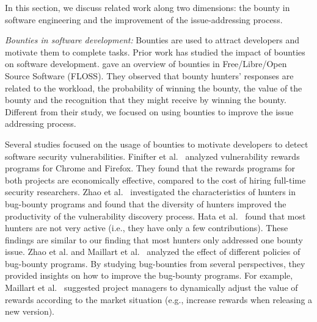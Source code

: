 In this section, we discuss related work along two dimensions: the bounty in software engineering and the improvement of the issue-addressing process.

\textit{Bounties in software development:}
Bounties are used to attract developers and motivate them to complete tasks. Prior work has studied the impact of bounties on software development. \cite{krishnamurthy2006bounty} gave an overview of bounties in Free/Libre/Open Source Software (FLOSS).
They observed that bounty hunters' responses are related to the workload, the probability of winning the bounty, the value of the bounty and the recognition that they might receive by winning the bounty. Different from their study, we focused on using bounties to improve the issue addressing process.

\begin{comment}
    Once the profit is higher than the workload, they will respond to the bounty. However, it is very hard to evaluate the profit and workload in an accuracy way.
\end{comment}

Several studies focused on the usage of bounties to motivate developers to detect software security vulnerabilities.
Finifter et al.~\cite{finifter2013empirical} analyzed vulnerability rewards programs for Chrome and Firefox. They found that the rewards programs for both projects are economically effective, compared to the cost of hiring full-time security researchers.
Zhao et al.~\cite{zhao2014exploratory} investigated the characteristics of hunters in bug-bounty programs and found that the diversity of hunters improved the productivity of the vulnerability discovery process. Hata et al.~\cite{hata2017understanding} found that most hunters are not very active (i.e., they have only a few contributions). These findings are similar to our finding that most hunters only addressed one bounty issue. %
Zhao et al. and Maillart et al.~\cite{zhao2017devising,maillart2017given} analyzed the effect of different policies of bug-bounty programs.
By studying bug-bounties from several perspectives, they provided insights on how to improve the bug-bounty programs. For example, Maillart et al.~\cite{maillart2017given} suggested project managers to dynamically adjust the value of rewards according to the market situation (e.g., increase rewards when releasing a new version).


